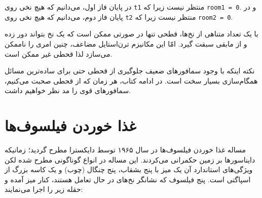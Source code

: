 \documentclass{book}
\newcommand{\clearemptydoublepage}{\newpage\cleardoublepage}
\begin{document}
    در پایان فاز اول، می‌دانیم که هیچ نخی روی  {\tt t1} منتظر نیست زیرا که {\tt room1 = 0}.
    و در پایان فاز دوم، می‌دانیم که هیچ نخی روی {\tt t2} منتظر نیست زیرا که {\tt room2 = 0}. 

    با یک تعداد متناهی از نخ‌ها، قطحی تنها در صورتی ممکن است که یک نخ بتواند دور زده و از مابقی سبقت گیرد.
    امّا این مکانیزم ترن‌استایل مضاعف، چنین امری را ناممکن می‌سازد لذا قحطی غیر ممکن است. 

    نکته اینکه با وجود سمافورهای ضعیف جلوگیری از قحطی حتی برای ساده‌ترین مسائل همگام‌سازی بسیار سخت است.
    در ادامه کتاب، هر زمان که از قحطی صحبت می‌کنیم، سمافورهای قوی را مد نظر خواهیم داشت. 


\clearemptydoublepage
\section
{غذا خوردن فیلسوف‌ها}
\label{dining}

    مساله غذا خوردن فیلسوف‌ها در سال ۱۹۶۵ توسط دایکسترا مطرح گردید؛ زمانیکه دایناسورها بر زمین حکمرانی می‌کردند\cite{dijkstra65}. 
    این مساله در انواع گوناگونی مطرح شده لکن ویژگی‌های استاندارد آن یک میز با پنج بشقاب، پنج چنگال (چوب) و یک کاسه بزرگ از اسپاگتی است. 
    پنج فیلسوف که نشانگر نخ‌های در حال تعامل هستند، کنار میز آمده و حقله زیر را اجرا می‌نمایند: 
    
\end{document}
